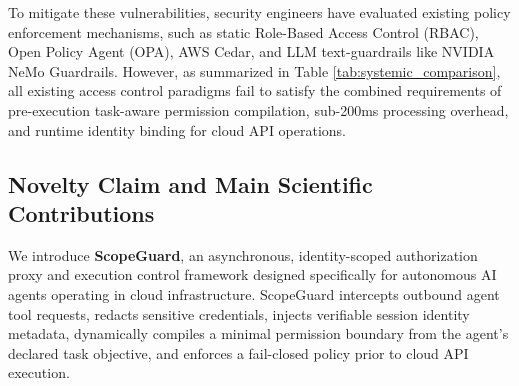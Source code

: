 \documentclass[conference]{IEEEtran}
\begin{document}
To mitigate these vulnerabilities, security engineers have evaluated existing policy enforcement mechanisms, such as static Role-Based Access Control (RBAC), Open Policy Agent (OPA), AWS Cedar, and LLM text-guardrails like NVIDIA NeMo Guardrails. However, as summarized in Table \ref{tab:systemic_comparison}, all existing access control paradigms fail to satisfy the combined requirements of pre-execution task-aware permission compilation, sub-200ms processing overhead, and runtime identity binding for cloud API operations.

\begin{table}[t]
\caption{Systemic Comparison of Access Control Paradigms for Autonomous AI Agents in Cloud Infrastructure}
\label{tab:systemic_comparison}
\centering
{}
\end{table}

\subsection{Novelty Claim and Main Scientific Contributions}
We introduce \textbf{ScopeGuard}, an asynchronous, identity-scoped authorization proxy and execution control framework designed specifically for autonomous AI agents operating in cloud infrastructure. ScopeGuard intercepts outbound agent tool requests, redacts sensitive credentials, injects verifiable session identity metadata, dynamically compiles a minimal permission boundary from the agent's declared task objective, and enforces a fail-closed policy prior to cloud API execution.
\end{document}
